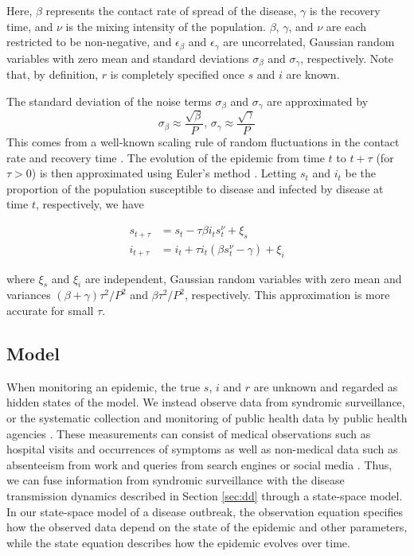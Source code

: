 \documentclass{elsarticle}
\begin{document}
\noindent Here, $\beta$ represents the contact rate of spread of the disease, $\gamma$ is the recovery time, and $\nu$ is the mixing intensity of the population.  $\beta$, $\gamma$, and $\nu$ are each restricted to be non-negative, and $\epsilon_\beta$ and $\epsilon_\gamma$ are uncorrelated, Gaussian random variables with zero mean and standard deviations $\sigma_\beta$ and $\sigma_\gamma$, respectively.  Note that, by definition, $r$ is completely specified once $s$ and $i$ are known.

The standard deviation of the noise terms $\sigma_\beta$ and $\sigma_\gamma$ are approximated by
\[\sigma_\beta \approx \frac{\sqrt{\beta}}{P} \mbox{, } \sigma_\gamma \approx \frac{\sqrt{\gamma}}{P}\]
This comes from a well-known scaling rule of random fluctuations in the contact rate and recovery time \citep{ovaskainen2010extinction, herwaarden1995stochepid, dangerfield2009stochepid}.  The evolution of the epidemic from time $t$ to $t + \tau$ (for $\tau > 0$) is then approximated using Euler's method \citep{atkinson1989numericalanalysis}.  Letting $s_t$ and $i_t$ be the proportion of the population susceptible to disease and infected by disease at time $t$, respectively, we have

\begin{align}
s_{t+\tau} &= s_t - \tau\beta i_ts^\nu_t + \xi_s \label{eqn:s} \\
i_{t+\tau} &= i_t + \tau i_t(\beta s^\nu_t - \gamma) + \xi_i \label{eqn:i}
\end{align}

\noindent where $\xi_s$ and $\xi_i$ are independent, Gaussian random variables with zero mean and variances $(\beta + \gamma)\tau^2/P^2$ and $\beta\tau^2/P^2$, respectively.  This approximation is more accurate for small $\tau$.

\subsection{Model}

When monitoring an epidemic, the true $s$, $i$ and $r$ are unknown and regarded as hidden states of the model.  We instead observe data from syndromic surveillance, or the systematic collection and monitoring of public health data by public health agencies \citep{wagner2006biosurveillance, wilson2006synsurveillance}.  These measurements can consist of medical observations such as hospital visits and occurrences of symptoms as well as non-medical data such as absenteeism from work and queries from search engines or social media \citep{chew2010twitter, schuster2010searchquery, signorini2011twitter, Gins:Mohe:Pate:Bram:Smol:Bril:dete:2009}.  Thus, we can fuse information from syndromic surveillance with the disease transmission dynamics described in Section \ref{sec:dd} through a state-space model.  In our state-space model of a disease outbreak, the observation equation specifies how the observed data depend on the state of the epidemic and other parameters, while the state equation describes how the epidemic evolves over time.
\end{document}
